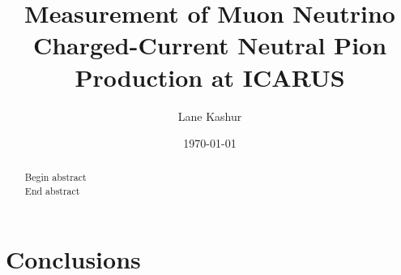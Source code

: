 \documentclass[]{article}
\title{Measurement of Muon Neutrino Charged-Current Neutral Pion Production at ICARUS}
\author{Lane Kashur}
\date{\today}
\begin{document}
\maketitle

\begin{abstract}
Begin abstract \vspace{1cm} \\

End abstract
\end{abstract}

\tableofcontents






\section{Conclusions}

%

\printbibliography

\begin{appendices}






\end{appendices}
\end{document}
